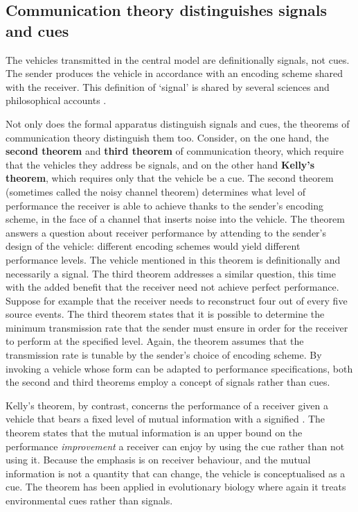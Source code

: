 \subsection{Communication theory distinguishes signals and cues}

The vehicles transmitted in the central model are definitionally signals, not cues.
The sender produces the vehicle in accordance with an encoding scheme shared with the receiver.
This definition of `signal' is shared by several sciences \citep{shannon1948mathematicala,maynardsmith2003animal} and philosophical accounts \citep[$\S$6]{millikan2004varieties} \citep{bergstrom2011transmission}.

Not only does the formal apparatus distinguish signals and cues, the theorems of communication theory distinguish them too.
Consider, on the one hand, the \textbf{second theorem} and \textbf{third theorem} of communication theory, which require that the vehicles they address be signals, and on the other hand \textbf{Kelly's theorem}, which requires only that the vehicle be a cue.
The second theorem (sometimes called the noisy channel theorem) determines what level of performance the receiver is able to achieve thanks to the sender's encoding scheme, in the face of a channel that inserts noise into the vehicle.
The theorem answers a question about receiver performance by attending to the sender's design of the vehicle: different encoding schemes would yield different performance levels.
The vehicle mentioned in this theorem is definitionally and necessarily a signal.
The third theorem addresses a similar question, this time with the added benefit that the receiver need not achieve perfect performance.
Suppose for example that the receiver needs to reconstruct four out of every five source events.
The third theorem states that it is possible to determine the minimum transmission rate that the sender must ensure in order for the receiver to perform at the specified level.
Again, the theorem assumes that the transmission rate is tunable by the sender's choice of encoding scheme.
By invoking a vehicle whose form can be adapted to performance specifications, both the second and third theorems employ a concept of signals rather than cues.

Kelly's theorem, by contrast, concerns the performance of a receiver given a vehicle that bears a fixed level of mutual information with a signified \citep{kelly1956new}.
The theorem states that the mutual information is an upper bound on the performance \textit{improvement} a receiver can enjoy by using the cue rather than not using it.
Because the emphasis is on receiver behaviour, and the mutual information is not a quantity that can change, the vehicle is conceptualised as a cue.
The theorem has been applied in evolutionary biology \citep{donaldson-matasci2010fitness} where again it treats environmental cues rather than signals.

